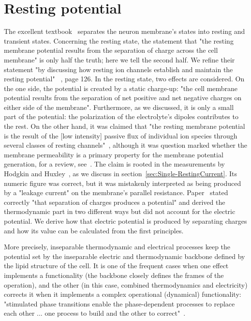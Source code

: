 
\section[Resting potential]{Resting potential\label{sec:Single-RestingPotential}}

The excellent textbook~\cite{PrinciplesNeuralScience:2013} separates the neuron membrane's states into \hypertarget{RestingState}{resting} and transient states. Concerning the resting state, the statement that "the resting membrane potential results
from the separation of charge across the
cell membrane" is only half the truth; here we tell the second half. 
We refine their statement "by discussing how resting ion channels
establish and maintain the resting potential" ~\cite{PrinciplesNeuralScience:2013}, page 126.
In the resting state, two effects are considered. On the one side, the potential is created by a static charge-up: "the cell membrane potential results from the
separation of net positive and net negative charges on
either side of the membrane".  Furthermore, as we discussed, it is only a small part of the potential: the polarization of the electrolyte's dipoles contributes to the rest. On the other hand, it was claimed that "the resting membrane potential is the result of the [low intensity]
passive flux of individual ion species through several
classes of resting channels"~\cite{PrinciplesNeuralScience:2013},
although it was question marked whether the membrane permeability is a primary property for the 
membrane potential generation, for a review, see~\cite{MembranePotentialPermeability:2024}. The claim is rooted in the measurements by Hodgkin and Huxley~\cite{CompanionGuideHodgkinHuxley:2022}, as we discuss in section~\ref{sec:Single-RestingCurrent}.
Its numeric figure was correct, but it was mistakenly interpreted as being produced by a "leakage current" on the membrane's parallel resistance.
Paper~\cite{OriginMembranePotential:2018} stated correctly "that separation of charges produces a potential" and derived the thermodynamic part in two different ways but did not account for the electric potential. We derive how that electric potential is produced by separating charges and how its value can be calculated from the first principles.

More precisely, inseparable thermodynamic and electrical processes keep the potential set by the inseparable electric and thermodynamic backbone defined by the lipid structure of the cell. It is one of the frequent cases when 
one effect implements a functionality (the backbone closely defines the frames of the operation), and the other (in this case, combined thermodynamics and electricity) corrects it when it implements a complex operational (dynamical) functionality:
"stimulated phase transitions enable the phase-dependent processes to replace each other ... one process to build and the other
to correct"~\cite{BiologicalConservationLaw:2017}.



